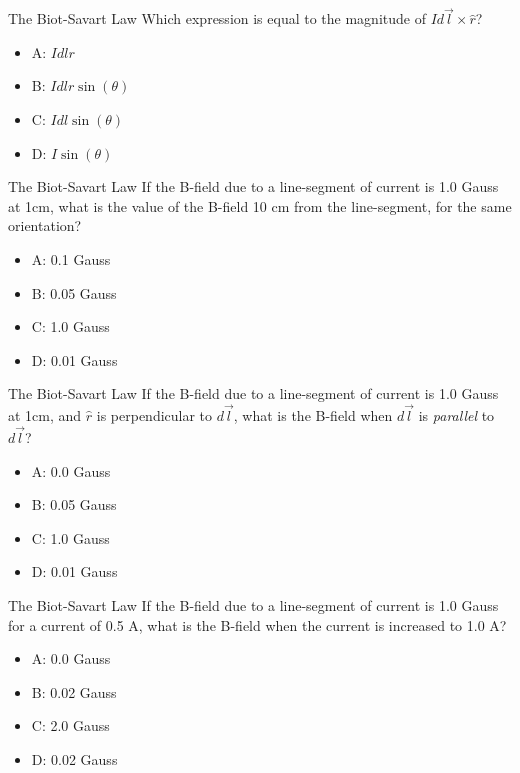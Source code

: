 \documentclass{beamer}
\begin{document}
\begin{frame}{The Biot-Savart Law}
Which expression is equal to the magnitude of $Id\vec{l} \times \hat{r}$?
\begin{itemize}
\item A: $Idlr$
\item B: $Idlr\sin(\theta)$
\item C: $Idl\sin(\theta)$
\item D: $I\sin(\theta)$
\end{itemize}
\end{frame}

\begin{frame}{The Biot-Savart Law}
If the B-field due to a line-segment of current is 1.0 Gauss at 1cm, what is the value of the B-field 10 cm from the line-segment, for the same orientation?
\begin{itemize}
\item A: 0.1 Gauss
\item B: 0.05 Gauss
\item C: 1.0 Gauss
\item D: 0.01 Gauss
\end{itemize}
\end{frame}

\begin{frame}{The Biot-Savart Law}
If the B-field due to a line-segment of current is 1.0 Gauss at 1cm, and $\hat{r}$ is perpendicular to $d\vec{l}$, what is the B-field when $d\vec{l}$ is \textit{parallel} to $d\vec{l}$?
\begin{itemize}
\item A: 0.0 Gauss
\item B: 0.05 Gauss
\item C: 1.0 Gauss
\item D: 0.01 Gauss
\end{itemize}
\end{frame}

\begin{frame}{The Biot-Savart Law}
If the B-field due to a line-segment of current is 1.0 Gauss for a current of 0.5 A, what is the B-field when the current is increased to 1.0 A?
\begin{itemize}
\item A: 0.0 Gauss
\item B: 0.02 Gauss
\item C: 2.0 Gauss
\item D: 0.02 Gauss
\end{itemize}
\end{frame}
\end{document}
